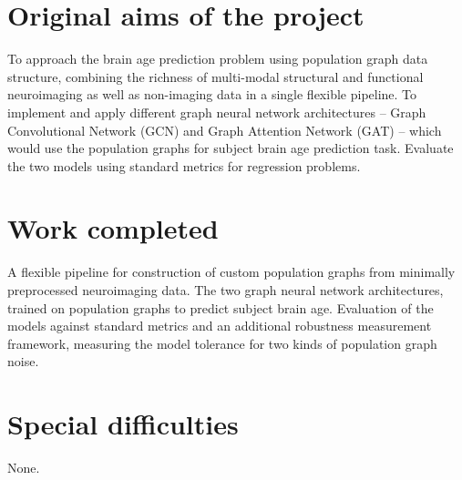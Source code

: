 
\section*{Original aims of the project}

To approach the brain age prediction problem using population graph data structure, combining the richness of multi-modal structural and functional neuroimaging as well as non-imaging data in a single flexible pipeline.
To implement and apply different graph neural network architectures – Graph Convolutional Network (GCN) and Graph Attention Network (GAT) – which would use the population graphs for subject brain age prediction task. Evaluate the two models using standard metrics for regression problems.


\section*{Work completed}
A flexible pipeline for construction of custom population graphs from minimally preprocessed neuroimaging data. The two graph neural network architectures, trained on population graphs to predict subject brain age. Evaluation of the models against standard metrics and an additional robustness measurement framework, measuring the model tolerance for two kinds of population graph noise.

\section*{Special difficulties}

None.

\tableofcontents


